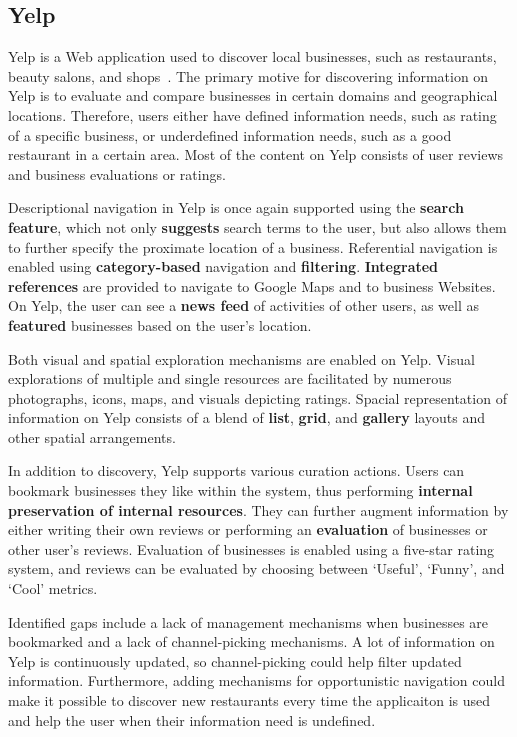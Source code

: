 \documentclass{sigchi}
\begin{document}
{{\subsection{Yelp}
Yelp is a Web application used to discover local businesses, such as restaurants, beauty salons, and shops~\cite{luca2011reviews}. The primary motive for discovering information on Yelp is to evaluate and compare businesses in certain domains and geographical locations. Therefore, users either have defined information needs, such as rating of a specific business, or underdefined information needs, such as a good restaurant in a certain area. Most of the content on Yelp consists of user reviews and business evaluations or ratings. 

Descriptional navigation in Yelp is once again supported using the \textbf{search feature}, which not only \textbf{suggests} search terms to the user, but also allows them to further specify the proximate location of a business. Referential navigation is enabled using \textbf{category-based} navigation and \textbf{filtering}. \textbf{Integrated references} are provided to navigate to Google Maps and to business Websites.  On Yelp, the user can see a \textbf{news feed} of activities of other users, as well as \textbf{featured} businesses based on the user's location. 

Both visual and spatial exploration mechanisms are enabled on Yelp. Visual explorations of multiple and single resources are facilitated by numerous photographs, icons, maps, and visuals depicting ratings. Spacial representation of information on Yelp consists of a blend of \textbf{list}, \textbf{grid}, and \textbf{gallery} layouts and other spatial arrangements.

In addition to discovery, Yelp supports various curation actions. Users can bookmark businesses they like within the system, thus performing \textbf{internal preservation of internal resources}. They can further augment information by either writing their own reviews or performing an \textbf{evaluation} of businesses or other user's reviews. Evaluation of businesses is enabled using a five-star rating system, and reviews can be evaluated by choosing between `Useful', `Funny', and `Cool' metrics. 

Identified gaps include a lack of management mechanisms when businesses are bookmarked and a lack of channel-picking mechanisms. A lot of information on Yelp is continuously updated, so channel-picking could help filter updated information. Furthermore, adding mechanisms for opportunistic navigation could make it possible to discover new restaurants every time the applicaiton is used and help the user when their information need is undefined.
 
}}
\end{document}
